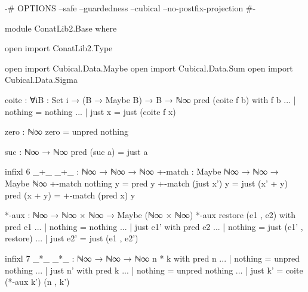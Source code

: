 \begin{code}[hide]
{-# OPTIONS --safe --guardedness --cubical --no-postfix-projection #-}

module ConatLib2.Base where

open import ConatLib2.Type

open import Cubical.Data.Maybe
open import Cubical.Data.Sum
open import Cubical.Data.Sigma

coite : ∀{i}{B : Set i} → (B → Maybe B) → B → ℕ∞
pred (coite f b) with f b
... | nothing = nothing
... | just x  = just (coite f x)

zero : ℕ∞
zero = unpred nothing

suc : ℕ∞ → ℕ∞
pred (suc a) = just a

infixl 6 _+_
_+_ : ℕ∞ → ℕ∞ → ℕ∞
+-match : Maybe ℕ∞ → ℕ∞ → Maybe ℕ∞
+-match nothing    y = pred y
+-match (just x')  y = just (x' + y)
pred (x + y) = +-match (pred x) y

*-aux : ℕ∞ → ℕ∞ × ℕ∞ → Maybe (ℕ∞ × ℕ∞)
*-aux restore (e1 , e2) with pred e1
... | nothing = nothing
... | just e1' with pred e2
... | nothing = just (e1' , restore)
... | just e2' = just (e1 , e2')

infixl 7 _*_
_*_ : ℕ∞ → ℕ∞ → ℕ∞
n * k with pred n
... | nothing = unpred nothing
... | just n' with pred k
... | nothing = unpred nothing
... | just k' = coite (*-aux k') (n , k')
\end{code}
